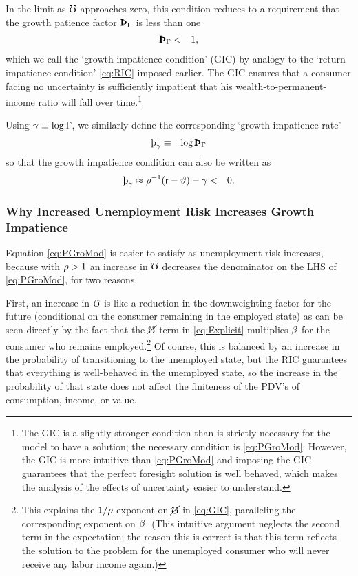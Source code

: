\documentclass{handout}
\begin{document}
In the limit as $\mho$ approaches zero, this
condition reduces to a requirement that the growth patience factor $\PatPGro$ is
less than one
\begin{eqnarray}
  \PatPGro & < & 1, \label{eq:GIC}
\end{eqnarray}
which we call the `growth impatience condition' (GIC) by analogy to the
`return impatience condition' \eqref{eq:RIC} imposed earlier.  The GIC ensures that a
consumer facing no uncertainty is sufficiently impatient that his
wealth-to-permanent-income ratio will fall over time.\footnote{The GIC is a slightly
  stronger condition than is strictly necessary for the model to have a solution; the necessary
  condition is \eqref{eq:PGroMod}.
  However, the GIC is more intuitive than \eqref{eq:PGroMod} and
  imposing the GIC guarantees that the perfect foresight solution is
  well behaved, which makes the analysis of the effects of uncertainty
  easier to understand.}

Using $\gamma \equiv \log \Gamma$, we similarly define the corresponding `growth impatience rate'
\begin{eqnarray}
  \patpGro & \equiv & \log \PatPGro
\end{eqnarray}
so that the growth impatience condition can also be written as
\begin{eqnarray}
  \patpGro \approx \CRRA^{-1}(\rfree-\timeRate)-\gamma & < & 0 . \label{eq:GICrate}
\end{eqnarray}

\subsubsection{Why Increased Unemployment Risk Increases Growth
  Impatience}

Equation \eqref{eq:PGroMod} is easier to satisfy as unemployment risk increases, because
with $\rho > 1$ an increase in $\mho$ decreases the denominator on
the LHS of \eqref{eq:PGroMod}, for two reasons.

First, an increase in $\mho$ is like a reduction in the
downweighting factor for the future (conditional on the consumer
remaining in the employed state) as can be seen directly by the fact
that the $\cancel{\mho}$ term in \eqref{eq:Explicit} multiplies $\beta$
for the consumer who remains employed.\footnote{This explains the
  $1/\rho$ exponent on $\cancel{\mho}$ in \eqref{eq:GIC}, paralleling the
  corresponding exponent on $\beta$. (This intuitive argument
  neglects the second term in the expectation; the reason this is
  correct is that this term reflects the solution to the problem for
  the unemployed consumer who will never receive any labor income
  again.)}  Of course, this is balanced by an increase in the
probability of transitioning to the unemployed state, but the RIC
guarantees that everything is well-behaved in the unemployed state, so
the increase in the probability of that state does not affect the
finiteness of the PDV's of consumption, income, or value.
\end{document}
